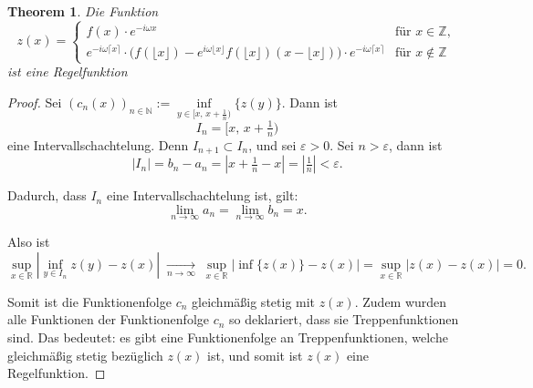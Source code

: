 \documentclass[a4paper,12pt]{article}
\newtheorem{theorem}{Theorem}[section]
\theoremstyle{definition}
\theoremstyle{remark}
\begin{document}
\begin{theorem}
  Die Funktion 
  \[
    z(x) =
    \begin{cases}
      f(x)\cdot e^{-i\omega x} & \text{für } x \in \mathbb{Z}, \\[6pt]
      e^{-i\omega \lceil x\rceil} \cdot \bigl( f(\lfloor x \rfloor) - e^{i\omega \lfloor x \rfloor} f(\lfloor x \rfloor)(x - \lfloor x \rfloor) \bigr) \cdot e^{-i\omega \lceil x\rceil} & \text{für } x \notin \mathbb{Z}
    \end{cases}
    \]
    ist eine Regelfunktion
  \end{theorem}
  \begin{proof}
    Sei \((c_n(x))_{n \in \mathbb{N}} := \underset{y \in \bigl[x,\, x + \tfrac{1}{n}\bigr)}{\inf} \{z(y)\}\).
    Dann ist 
    \[
      I_n = \bigl[ x,\, x + \tfrac{1}{n} \bigr)
      \]
      eine Intervallschachtelung. Denn \( I_{n+1} \subset I_n \), und sei \(\varepsilon > 0\).  
      Sei \( n > \varepsilon \), dann ist
      \[
        |I_n| = b_n - a_n = \left| x + \tfrac{1}{n} - x \right| = \left| \tfrac{1}{n} \right| < \varepsilon.
        \]
        
        Dadurch, dass \( I_n \) eine Intervallschachtelung ist, gilt:
        \[
          \lim_{n \to \infty} a_n = \lim_{n \to \infty} b_n = x.
          \]
          
          Also ist
          \[
            \sup_{x \in \mathbb{R}} \left| \inf_{y \in I_n} z(y) - z(x) \right| 
            \;\xrightarrow[n \to \infty]{}\;
            \sup_{x \in \mathbb{R}} \left| \inf \{z(x)\}- z(x) \right|
            = \sup_{x \in \mathbb{R}} \left| z(x) - z(x) \right| 
            = 0.
            \]
            
            \medskip
            
Somit ist die Funktionenfolge \(c_n\) gleichmäßig stetig mit \(z(x)\).  
Zudem wurden alle Funktionen der Funktionenfolge \(c_n\) so deklariert, 
dass sie Treppenfunktionen sind. Das bedeutet: es gibt eine Funktionenfolge an 
Treppenfunktionen, welche gleichmäßig stetig bezüglich \(z(x)\) ist, und somit 
ist \(z(x)\) eine Regelfunktion.
            
\end{proof}
          
\end{document}
